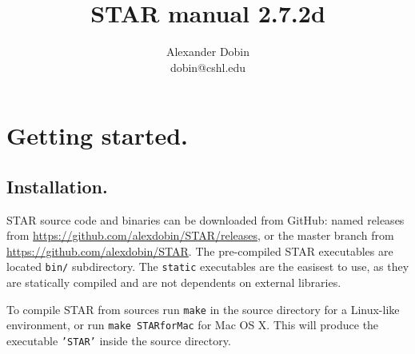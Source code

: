\documentclass[12pt]{article}
\begin{document}
\hypersetup{
	linkcolor=MidnightBlue
	}


\newcommand{\optn}[1]{\sloppy\textcolor{violet}{\texttt{--#1}}}
\newcommand{\opt}[1]{\sloppy\hyperlink{#1}{\optn{#1}}}
\newcommand{\optv}[1]{\sloppy\texttt{#1}}
\newcommand{\optvr}[1]{\sloppy\textit{\texttt{#1}}}

\newcommand{\code}[1]{\sloppy\texttt{#1}}
	
\newcommand{\codelines}[1]{\begin{adjustwidth}{0.5in}{0in}
	\raggedright\texttt{#1}
	\end{adjustwidth}}

\newcommand{\ofilen}[1]{\sloppy\texttt{#1}}

\newcommand{\sechyperref}[1]{\hyperref[#1]{Section \ref{#1}. \nameref{#1}}}

\title{STAR manual 2.7.2d}
\author{Alexander Dobin\\
dobin@cshl.edu}
\maketitle
\tableofcontents

\newpage

\section{Getting started.}
\subsection{Installation.}

STAR source code and binaries can be downloaded from GitHub: named releases from \url{https://github.com/alexdobin/STAR/releases}, or the master branch from \url{https://github.com/alexdobin/STAR}. The pre-compiled STAR executables are  located \code{bin/} subdirectory. The \code{static} executables are the easisest to use, as they are statically compiled and are not dependents on external libraries. 

To compile STAR from sources run \code{make} in the source directory for a Linux-like environment, or run \code{make STARforMac} for Mac OS X. This will produce the executable \code{'STAR'} inside the source directory.
\end{document}
